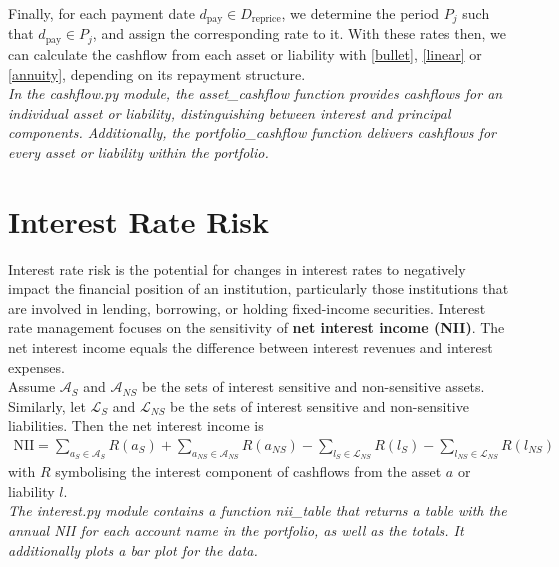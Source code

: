 \documentclass[11pt]{report}
\begin{document}
Finally, for each payment date \(d_{\text{pay}}\in D_{\text{reprice}}\), we determine the period \(P_j\) such that \(d_{\text{pay}}\in P_j\), and assign the corresponding rate to it. With these rates then, we can calculate the cashflow from each asset or liability with \eqref{bullet}, \eqref{linear} or \eqref{annuity}, depending on its repayment structure.\\

\textit{In the cashflow.py module, the asset\_cashflow function provides cashflows for an individual asset or liability, distinguishing between interest and principal components. Additionally, the portfolio\_cashflow function delivers cashflows for every asset or liability within the portfolio.}



\section{Interest Rate Risk}

Interest rate risk is the potential for changes in interest rates to negatively impact the financial position of an institution, particularly those institutions that are involved in lending, borrowing, or holding fixed-income securities. Interest rate management focuses on the sensitivity of \textbf{net interest income (NII)}.  The net interest income equals the difference between interest revenues and interest expenses.\\

Assume $\mathcal{A}_S$ and $\mathcal{A}_{NS}$ be the sets of interest sensitive and non-sensitive assets. Similarly, let $\mathcal{L}_S$ and $\mathcal{L}_{NS}$ be the sets of interest sensitive and non-sensitive liabilities. Then the net interest income is
\begin{align}
	\text{NII}=\sum_{a_S\in\mathcal{A}_S}R(a_S)+\sum_{a_{NS}\in\mathcal{A}_{NS}}R(a_{NS})-\sum_{l_S\in\mathcal{L}_{NS}}R(l_S)-\sum_{l_{NS}\in\mathcal{L}_{NS}}R(l_{NS})
\end{align}
with $R$ symbolising the interest component of cashflows from the asset $a$ or liability $l$.\\


\textit{The \textit{interest.py} module contains a function \textit{nii\_table} that returns a table with the annual NII for each account name in the portfolio, as well as the totals. It additionally plots a bar plot for the data.} \\
\end{document}
